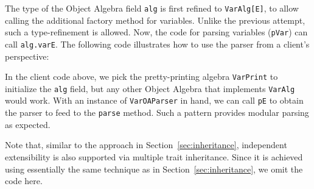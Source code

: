 \vspace{-4pt}
\vspace{-4pt}

\noindent The type of the Object Algebra field \lstinline{alg} is first refined
to \lstinline{VarAlg[E]}, to allow calling the additional factory method
for variables. Unlike the previous attempt, such a type-refinement is allowed.
Now, the code for parsing variables (\lstinline{pVar}) can
call \lstinline{alg.varE}. The following code illustrates how to use
the parser from a client's perspective:

\vspace{-4pt}
\vspace{-4pt}

In the client code above,
we pick the pretty-printing algebra \lstinline{VarPrint} to initialize the \lstinline{alg} field, but any other Object
Algebra that implements \lstinline{VarAlg} would work.
With an instance of \lstinline{VarOAParser} in hand, we can call
\lstinline{pE} to obtain the parser to feed to the \lstinline{parse} method.
Such a pattern provides modular parsing as expected.

Note that, similar to the approach in Section~\ref{sec:inheritance}, independent extensibility is also supported via multiple trait inheritance.
Since it is achieved using essentially the same technique as in Section~\ref{sec:inheritance}, we omit the code here.

